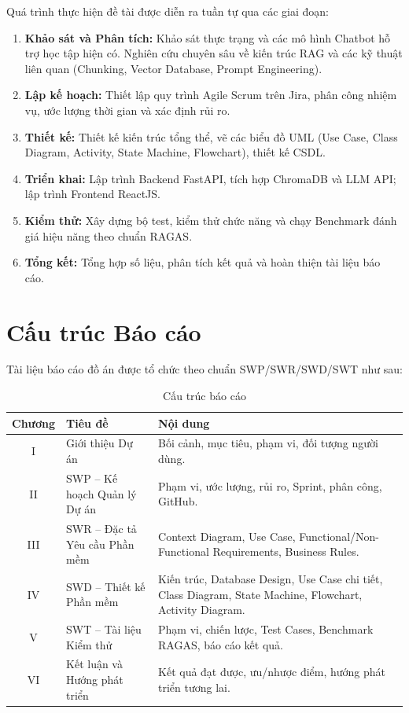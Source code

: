 Quá trình thực hiện đề tài được diễn ra tuần tự qua các giai đoạn:

\begin{enumerate}[label=\textbf{Giai đoạn \arabic*:}, leftmargin=*, itemsep=6pt]
  \item \textbf{Khảo sát và Phân tích:} Khảo sát thực trạng và các mô hình Chatbot hỗ trợ học tập hiện có. Nghiên cứu chuyên sâu về kiến trúc RAG và các kỹ thuật liên quan (Chunking, Vector Database, Prompt Engineering).
  \item \textbf{Lập kế hoạch:} Thiết lập quy trình Agile Scrum trên Jira, phân công nhiệm vụ, ước lượng thời gian và xác định rủi ro.
  \item \textbf{Thiết kế:} Thiết kế kiến trúc tổng thể, vẽ các biểu đồ UML (Use Case, Class Diagram, Activity, State Machine, Flowchart), thiết kế CSDL.
  \item \textbf{Triển khai:} Lập trình Backend FastAPI, tích hợp ChromaDB và LLM API; lập trình Frontend ReactJS.
  \item \textbf{Kiểm thử:} Xây dựng bộ test, kiểm thử chức năng và chạy Benchmark đánh giá hiệu năng theo chuẩn RAGAS.
  \item \textbf{Tổng kết:} Tổng hợp số liệu, phân tích kết quả và hoàn thiện tài liệu báo cáo.
\end{enumerate}

\section{Cấu trúc Báo cáo}

Tài liệu báo cáo đồ án được tổ chức theo chuẩn SWP/SWR/SWD/SWT như sau:

\begin{table}[H]
  \centering
  \caption{Cấu trúc báo cáo}
  \label{tab:structure}
  \renewcommand{\arraystretch}{1.4}
  \begin{tabularx}{\textwidth}{|c|l|X|}
    \hline
    \rowcolor{blue!15}
    \textbf{Chương} & \textbf{Tiêu đề} & \textbf{Nội dung} \\
    \hline
    I & Giới thiệu Dự án & Bối cảnh, mục tiêu, phạm vi, đối tượng người dùng. \\
    \hline
    II & SWP -- Kế hoạch Quản lý Dự án & Phạm vi, ước lượng, rủi ro, Sprint, phân công, GitHub. \\
    \hline
    III & SWR -- Đặc tả Yêu cầu Phần mềm & Context Diagram, Use Case, Functional/Non-Functional Requirements, Business Rules. \\
    \hline
    IV & SWD -- Thiết kế Phần mềm & Kiến trúc, Database Design, Use Case chi tiết, Class Diagram, State Machine, Flowchart, Activity Diagram. \\
    \hline
    V & SWT -- Tài liệu Kiểm thử & Phạm vi, chiến lược, Test Cases, Benchmark RAGAS, báo cáo kết quả. \\
    \hline
    VI & Kết luận và Hướng phát triển & Kết quả đạt được, ưu/nhược điểm, hướng phát triển tương lai. \\
    \hline
  \end{tabularx}
\end{table}

